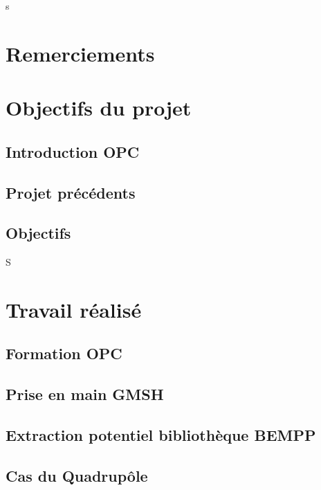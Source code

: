 s\documentclass{report}
\begin{document}
\begin{abstract}
    balblabalba %
\end{abstract}

\chapter*{Remerciements}
\newpage

\tableofcontents
\newpage


\chapter{Objectifs du projet}
\section{Introduction OPC}

\section{Projet précédents}
\section{Objectifs}

S\chapter{Travail réalisé}
\section{Formation OPC}
\section{Prise en main GMSH}
\section{Extraction potentiel bibliothèque BEMPP}

\section{Cas du Quadrupôle}
\end{document}
